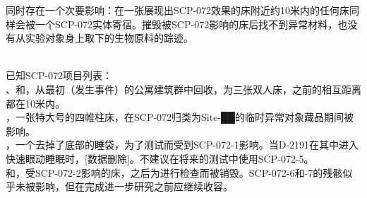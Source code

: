 同时存在一个次要影响：在一张展现出SCP-072效果的床附近约10米内的任何床同样会被一个SCP-072实体寄宿。摧毁被SCP-072影响的床后找不到异常材料，也没有从实验对象身上取下的生物原料的踪迹。

\\
已知SCP-072项目列表：\\
、和，从最初（发生事件）的公寓建筑群中回收，为三张双人床，之前的相互距离都在10米内。\\
，一张特大号的四帷柱床，在SCP-072归类为Site-██的临时异常对象藏品期间被影响。\\
，一个去掉了底部的睡袋，为了测试而受到SCP-072-1影响。当D-2191在其中进入快速眼动睡眠时，{[}数据删除]。不建议在将来的测试中使用SCP-072-5。\\
和，受SCP-072-2影响的床，之后为进行检查而被销毁。SCP-072-6和-7的残骸似乎未被影响，但在完成进一步研究之前应继续收容。
